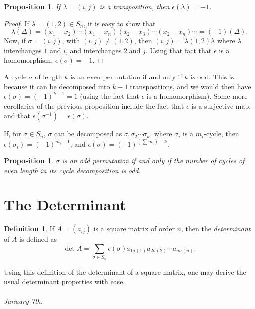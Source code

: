 \documentclass[15pt,a4paper]{book}
\newtheorem{proposition}[theorem]{Proposition}
\theoremstyle{definition}
\newtheorem{definition}[theorem]{Definition}
\newcommand{\eax}[1]{\emph{#1}\index{#1}} %
\begin{document}
\begin{proposition}
    If $\lambda = (i,j)$ is a transposition, then $\epsilon(\lambda) = -1$.
\end{proposition}
\begin{proof}
    If $\lambda = (1,2) \in S_{n}$, it is easy to show that
    \begin{equation}
        \lambda(\Delta) = (x_{1}-x_{2}) \cdots (x_{1}-x_{n}) (x_{2}-x_{3}) \cdots (x_{2}-x_{n}) \cdots = (-1)(\Delta).
    \end{equation}
    Now, if $\sigma = (i,j)$, with $(i,j) \neq (1,2)$, then $(i,j) = \lambda (1,2) \lambda$ where $\lambda$ interchanges $1$ and $i$, and interchanges $2$ and $j$. Using that fact that $\epsilon$ is a homomorphism, $\epsilon(\sigma) = -1$.
\end{proof}

A cycle $\sigma$ of length $k$ is an even permutation if and only if $k$ is odd. This is because it can be decomposed into $k-1$ transpositions, and we would then have $\epsilon(\sigma) = (-1)^{k-1} = 1$ (using the fact that $\epsilon$ is a homomorphism). Some more corollaries of the previous proposition include the fact that $\epsilon$ is a surjective map, and that $\epsilon(\sigma^{-1}) = \epsilon(\sigma)$.

If, for $\sigma \in S_{n}$, $\sigma$ can be decomposed as $\sigma_{1}\sigma_{2} \cdots \sigma_{k}$, where $\sigma_{i}$ is a $m_{i}$-cycle, then $\epsilon(\sigma_{i}) = (-1)^{m_{i}-1}$, and $\epsilon(\sigma) = (-1)^{(\sum m_{i}) - k}$.

\begin{proposition}
    $\sigma$ is an odd permutation if and only if the number of cycles of even length in its cycle decomposition is odd.
\end{proposition}

\section{The Determinant}

\begin{definition}
    If $A = (a_{ij})$ is a square matrix of order $n$, then the \eax{determinant} of $A$ is defined as
    \begin{equation}
        \det{A} = \sum_{\sigma \in S_{n}} \epsilon(\sigma) a_{1 \sigma(1)} a_{2 \sigma(2)} \cdots a_{n \sigma(n)}.
    \end{equation}
\end{definition}
Using this definition of the determinant of a square matrix, one may derive the usual determinant properties with ease.\\ \\
\textit{January 7th.}
\end{document}
